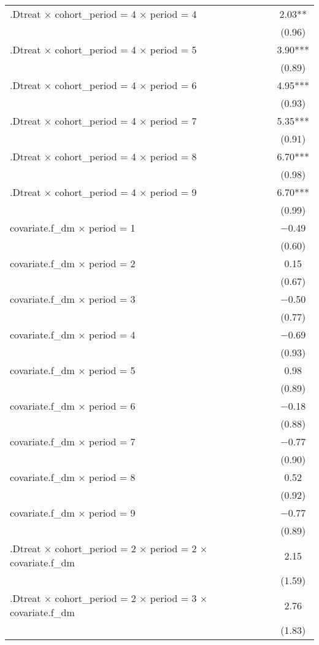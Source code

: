 \begin{table}
\begin{tabular}[t]{lc}
.Dtreat × cohort\_period = 4 × period = 4 & \num{2.03}**\\
 & (\num{0.96})\\
.Dtreat × cohort\_period = 4 × period = 5 & \num{3.90}***\\
 & \vphantom{2} (\num{0.89})\\
.Dtreat × cohort\_period = 4 × period = 6 & \num{4.95}***\\
 & \vphantom{1} (\num{0.93})\\
.Dtreat × cohort\_period = 4 × period = 7 & \num{5.35}***\\
 & (\num{0.91})\\
.Dtreat × cohort\_period = 4 × period = 8 & \num{6.70}***\\
 & (\num{0.98})\\
.Dtreat × cohort\_period = 4 × period = 9 & \num{6.70}***\\
 & (\num{0.99})\\
covariate.f\_dm × period = 1 & \num{-0.49}\\
 & (\num{0.60})\\
covariate.f\_dm × period = 2 & \num{0.15}\\
 & (\num{0.67})\\
covariate.f\_dm × period = 3 & \num{-0.50}\\
 & (\num{0.77})\\
covariate.f\_dm × period = 4 & \num{-0.69}\\
 & (\num{0.93})\\
covariate.f\_dm × period = 5 & \num{0.98}\\
 & \vphantom{1} (\num{0.89})\\
covariate.f\_dm × period = 6 & \num{-0.18}\\
 & (\num{0.88})\\
covariate.f\_dm × period = 7 & \num{-0.77}\\
 & (\num{0.90})\\
covariate.f\_dm × period = 8 & \num{0.52}\\
 & (\num{0.92})\\
covariate.f\_dm × period = 9 & \num{-0.77}\\
 & (\num{0.89})\\
.Dtreat × cohort\_period = 2 × period = 2 × covariate.f\_dm & \num{2.15}\\
 & (\num{1.59})\\
.Dtreat × cohort\_period = 2 × period = 3 × covariate.f\_dm & \num{2.76}\\
 & (\num{1.83})\\

\end{tabular}
\end{table}
